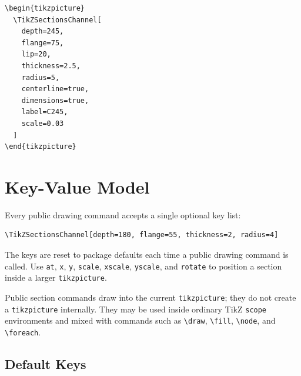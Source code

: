\documentclass[10pt]{article}
\newcommand{\command}[1]{\texttt{\textbackslash #1}}
\newcommand{\keyname}[1]{\texttt{#1}}
\begin{document}
\begin{lstlisting}
\begin{tikzpicture}
  \TikZSectionsChannel[
    depth=245,
    flange=75,
    lip=20,
    thickness=2.5,
    radius=5,
    centerline=true,
    dimensions=true,
    label=C245,
    scale=0.03
  ]
\end{tikzpicture}
\end{lstlisting}

\section{Key-Value Model}

Every public drawing command accepts a single optional key list:

\begin{lstlisting}
\TikZSectionsChannel[depth=180, flange=55, thickness=2, radius=4]
\end{lstlisting}

The keys are reset to package defaults each time a public drawing command is
called. Use \keyname{at}, \keyname{x}, \keyname{y}, \keyname{scale}, \keyname{xscale}, \keyname{yscale}, and \keyname{rotate} to
position a section inside a larger \texttt{tikzpicture}.

Public section commands draw into the current \texttt{tikzpicture}; they do not
create a \texttt{tikzpicture} internally. They may be used inside ordinary TikZ
\texttt{scope} environments and mixed with commands such as \command{draw},
\command{fill}, \command{node}, and \command{foreach}.

\subsection{Default Keys}
\end{document}
